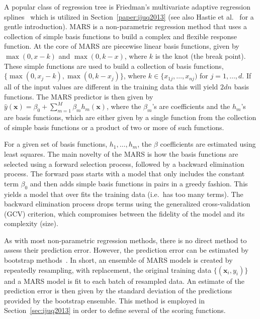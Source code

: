 A popular class of regression tree is Friedman's multivariate adaptive regression splines~\cite{Friedman1991} which is utilized in Section~\ref{paper:ijuq2013} (see also Hastie et al.~\cite{HastieTibshiraniFriedman2008} for a gentle introduction).
%
MARS is a non-parametric regression method that uses a collection of simple basis functions to build a complex and flexible response function.
%
At the core of MARS are piecewise linear basis functions, given by $\max(0, x - k)$ and $\max(0, k - x)$, where $k$ is the knot (the break point).
%
These simple functions are used to build a collection of basis functions, $\{\max(0, x_j-k), \max(0,k-x_j)\}$, where $k \in \{x_{1j}, \dots, x_{nj})$ for $j = 1, \dots, d$.
%
If all of the input values are different in the training data this will yield $2dn$ basis functions. The MARS predictor is then given by $\hat{y}(\mathbf{x}) = \beta_0 + \sum_{m=1}^M \beta_m h_m(\mathbf{x})$, where the $\beta_m$'s are coefficients and the $h_m$'s are basis functions, which are either given by a single function from the collection of simple basis functions or a product of
two or more of such functions.

For a given set of basis functions, $h_1, \dots, h_m$, the $\beta$ coefficients are estimated using least squares.
%
The main novelty of the MARS is how the basis functions are selected using a forward selection process, followed by a backward elimination process.
%
The forward pass starts with a model that only includes the constant term $\beta_0$ and then adds simple basis functions in pairs in a greedy fashion.
%
This yields a model that over fits the training data (i.e.\ has too many terms).
%
The backward elimination process drops terms using the generalized cross-validation (GCV) criterion, which compromises between the fidelity of the model and its complexity (size).

As with most non-parametric regression methods, there is no direct method to assess their prediction error.
%
However, the prediction error can be estimated by bootstrap methods~\cite{DavisonHinkley1997}.
%
In short, an ensemble of MARS models is created by repeatedly resampling, with replacement, the original training data $\{ (\mathbf{x}_i, y_i) \}$ and a MARS model is fit to each batch of resampled data.
%
An estimate of the prediction error is then given by the standard deviation of the predictions provided by the bootstrap ensemble.
%
This method is employed in Section~\ref{sec:ijuq2013} in order to define several of the scoring functions.

